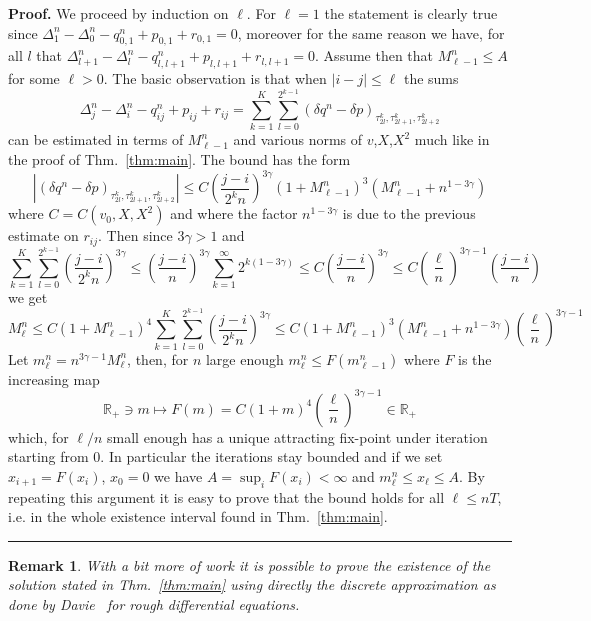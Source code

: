 \documentclass[a4paper,11pt,reqno]{article}
\newcommand{\der}{\delta}
\newcommand{\RR}{\mathbb{R}}
\newtheorem{remark}[theorem]{Remark}
\newenvironment{proof}[1][Proof]{\textbf{#1.} }{\ \rule{0.5em}{0.5em}}
\begin{document}
\begin{proof}
 We proceed by
induction on $\ell$. For $\ell=1$ the statement is clearly true since
$\Delta^n_{1}-\Delta^n_{0} -  q^n_{0,1}+p_{0,1}+r_{0,1}=0$, moreover
for the same reason we have, for all $l$ that
$\Delta^n_{l+1}-\Delta^n_{l} -  q^n_{l,l+1}+p_{l,l+1}+r_{l,l+1}=0$.
 Assume then
that $M^n_{\ell-1} \le A$ for some $\ell> 0$. The basic observation is that when $|i-j|\le \ell$
the sums
$$
\Delta^n_{j}-\Delta^n_{i} -  q^n_{ij}+p_{ij}+r_{ij} = \sum_{k=1}^K \sum_{l=0}^{2^{k-1}} (\der
q^n- \der p)_{\tau^k_{2l},\tau^k_{2l+1},\tau^k_{2l+2}}
$$
can be estimated in terms of $M^n_{\ell-1}$ and various norms of
$v$,$X$,$X^2$ much like in the proof of Thm.~\ref{thm:main}. The bound
has the form
$$
|(\der
q^n- \der p)_{\tau^k_{2l},\tau^k_{2l+1},\tau^k_{2l+2}}| \le C
\left(\frac{j-i}{2^k n}\right)^{3\gamma} (1+M^n_{\ell-1})^3 (M^n_{\ell-1}+n^{1-3\gamma})
$$
where $C=C(v_0,X,X^2)$ and where the factor $n^{1-3\gamma}$ is due to
the previous estimate on $r_{ij}$. Then since $3\gamma > 1$ and
$$
\sum_{k=1}^K \sum_{l=0}^{2^{k-1}}
\left(\frac{j-i}{2^k n}\right)^{3\gamma}  \le \left(\frac{j-i}{
    n}\right)^{3\gamma} \sum_{k=1}^\infty 2^{k(1-3\gamma)} \le C  \left(\frac{j-i}{
    n}\right)^{3\gamma} \le C \left(\frac{\ell}{
    n}\right)^{3\gamma-1}  \left(\frac{j-i}{
    n}\right) 
$$
we get
$$
M^n_\ell \le C
(1+M^n_{\ell-1})^4 \sum_{k=1}^K \sum_{l=0}^{2^{k-1}}
\left(\frac{j-i}{2^k n}\right)^{3\gamma} \le C (1+M^n_{\ell-1})^3 (M^n_{\ell-1}+n^{1-3\gamma}) \left(\frac{\ell}{
    n}\right)^{3\gamma-1} 
$$
Let $m^n_\ell = n^{3\gamma-1} M^{n}_\ell$, then, for $n$ large enough
$m^n_\ell \le F(m^n_{\ell-1})$ where
$F$ is the increasing map
$$
\RR_+ \ni m \mapsto F(m)= C (1+m)^4 \left(\frac{\ell}{
    n}\right)^{3\gamma-1} \in \RR_+
$$
which, for $\ell/n$ small enough
has a unique attracting fix-point under iteration starting from $0$. 
 In particular the
iterations stay bounded and if we  set $x_{i+1}=F(x_i)$, $x_0=0$ we
have $A = \sup_i F(x_i)  <
\infty$ and $m^n_\ell \le x_\ell \le A$. By repeating this argument it is easy to prove that the
bound holds for all $\ell \le nT$, i.e. in the whole existence
interval found in Thm.~\ref{thm:main}.
\end{proof}

\begin{remark}
With a bit more of work it is possible to prove the existence of
the solution stated in Thm.~\ref{thm:main} using directly the discrete
approximation as done by Davie~\cite{davie} for rough
differential equations.
\end{remark}
\end{document}
